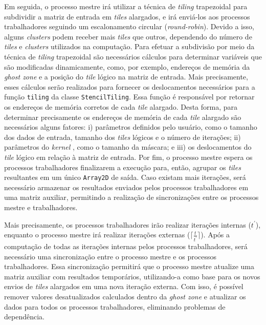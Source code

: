 Em seguida, o processo mestre irá utilizar a técnica de \textit{tiling}
trapezoidal para subdividir a matriz de entrada em \textit{tiles} alargados, e
irá enviá-los aos processos trabalhadores seguindo um escalonamento circular
(\textit{round-robin}).  Devido a isso, alguns \textit{clusters} podem receber
mais \textit{tiles} que outros, dependendo do número de \textit{tiles} e
\textit{clusters} utilizados na computação. Para efetuar a subdivisão por meio da técnica de \textit{tiling}
trapezoidal são necessários cálculos para determinar variáveis que são
modificadas dinamicamente, como, por exemplo, endereços de memória da
\textit{ghost zone} e a posição do \textit{tile} lógico na matriz de entrada.
Mais precisamente, esses cálculos serão realizados para fornecer os
deslocamentos necessários para a função \texttt{tiling} da classe
\texttt{StencilTiling}. Essa função é responsável por retornar os endereços de
memória corretos de cada \textit{tile} alargado. Desta forma, para determinar
precisamente os endereços de memória de cada \textit{tile} alargado são
necessários alguns fatores: i) parâmetros definidos pelo usuário, como o tamanho
dos dados de entrada, tamanho dos \textit{tiles} lógicos e o número de
iterações; ii) parâmetros do \textit{kernel} \stencil, como o tamanho da
máscara; e iii) os deslocamentos do \textit{tile} lógico em relação à matriz de
entrada. Por fim, o processo mestre espera os processos trabalhadores finalizarem a
execução para, então, agrupar os \textit{tiles} resultantes em um único \texttt{Array2D}
de saída. Caso existam mais iterações, será necessário armazenar os resultados
enviados pelos processos trabalhadores em uma matriz auxiliar, permitindo a realização
de sincronizações entre os processos mestre e trabalhadores.

Mais precisamente, os processos trabalhadores irão realizar iterações internas
($t^\prime$), enquanto o processo mestre irá realizar iterações externas
($\lceil\frac{t}{t^\prime}\rceil$). Após a computação de todas as iterações
internas pelos processos trabalhadores, será necessário uma sincronização entre
o processo mestre e os processos trabalhadores. Essa sincronização permitirá que
o processo mestre atualize uma matriz auxiliar com resultados temporários,
utilizando-a como base para os novos envios de \textit{tiles} alargados em uma
nova iteração externa. Com isso, é possível remover valores desatualizados
calculados dentro da \textit{ghost zone} e atualizar os dados para todos os
processos trabalhadores, eliminando problemas de dependência.

